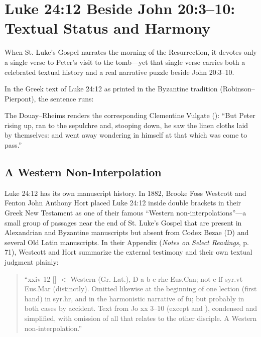 \section{Luke 24:12 Beside John 20:3--10: Textual Status and Harmony}
\label{sec:luke-john}

When St. Luke's Gospel narrates the morning of the Resurrection, it devotes only a single verse to Peter's visit to the tomb---yet that single verse carries both a celebrated textual history and a real narrative puzzle beside John 20:3--10.

In the Greek text of Luke 24:12 as printed in the Byzantine tradition (Robinson--Pierpont), the sentence runs:
\begin{quote}
\end{quote}
The Douay--Rheims renders the corresponding Clementine Vulgate (): ``But Peter rising up, ran to the sepulchre and, stooping down, he saw the linen cloths laid by themselves: and went away wondering in himself at that which was come to pass.''

\subsection{A Western Non-Interpolation}

Luke 24:12 has its own manuscript history. In 1882, Brooke Foss Westcott and Fenton John Anthony Hort placed Luke 24:12 inside double brackets in their Greek New Testament as one of their famous ``Western non-interpolations''---a small group of passages near the end of St. Luke's Gospel that are present in Alexandrian and Byzantine manuscripts but absent from Codex Bezae (D) and several Old Latin manuscripts. In their Appendix (\emph{Notes on Select Readings}, p. 71), Westcott and Hort summarize the external testimony and their own textual judgment plainly:
\begin{quote}
``xxiv 12 [] $<$ Western (Gr. Lat.), D a b e rhe Eus.Can; not c ff syr.vt Eus.Mar (distinctly). Omitted likewise at the beginning of one lection (first hand) in syr.hr, and in the harmonistic narrative of fu; but probably in both cases by accident. Text from Jo xx 3--10 (except  and ), condensed and simplified, with omission of all that relates to the other disciple. A Western non-interpolation.''
\end{quote}

